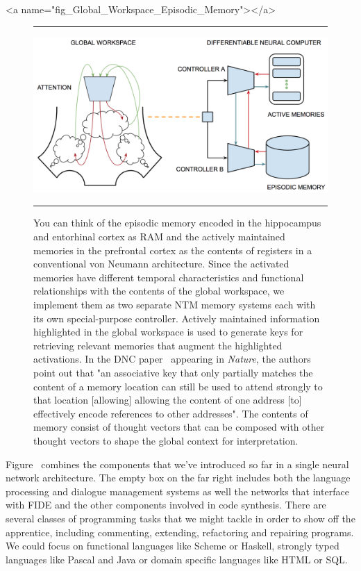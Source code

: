 \rawhtml
<a name="fig_Global_Workspace_Episodic_Memory"></a>
\endrawhtml
\begin{figure}
%
  \hrule{}
%
  \begin{center} 
    \includegraphics[width=590pt]{./figures/Global_Workspace_Episodic_Memory.png} %
  \end{center}
%
  \caption{You can think of the episodic memory encoded in the hippocampus and entorhinal cortex as RAM and the actively maintained memories in the prefrontal cortex as the contents of registers in a conventional von Neumann architecture. Since the activated memories have different temporal characteristics and functional relationships with the contents of the global workspace, we implement them as two separate NTM memory systems each with its own special-purpose controller. Actively maintained information highlighted in the global workspace is used to generate keys for retrieving relevant memories that augment the highlighted activations. In the DNC paper~\cite{GravesetalNATURE-16} appearing in {\it{Nature}}, the authors point out that "an associative key that only partially matches the content of a memory location can still be used to attend strongly to that location [allowing] allowing the content of one address [to] effectively encode references to other addresses". The contents of memory consist of thought vectors that can be composed with other thought vectors to shape the global context for interpretation.}
%
  \hrule{}
%
\end{figure}


Figure~{} combines the components that we've introduced so far in a single neural network architecture. The empty box on the far right includes both the language processing and dialogue management systems as well the networks that interface with FIDE and the other components involved in code synthesis. There are several classes of programming tasks that we might tackle in order to show off the apprentice, including commenting, extending, refactoring and repairing programs. We could focus on functional languages like Scheme or Haskell, strongly typed languages like Pascal and Java or domain specific languages like HTML or SQL. 

